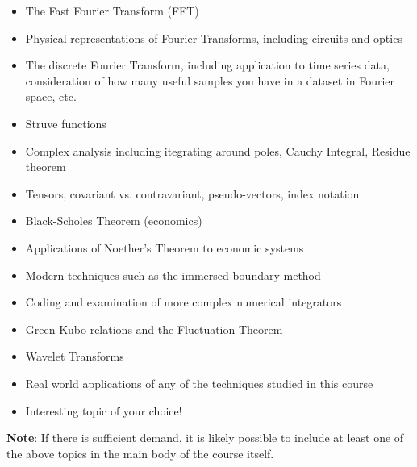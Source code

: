\documentclass[12pt]{article}
\begin{document}
\begin{itemize}
  \item The Fast Fourier Transform (FFT)
  \item Physical representations of Fourier Transforms, including circuits and optics
  \item The discrete Fourier Transform, including application to time series data, consideration of how many useful samples you have in a dataset in Fourier space, etc.
  \item Struve functions
  \item Complex analysis including itegrating around poles, Cauchy Integral, Residue theorem
  \item Tensors, covariant vs. contravariant, pseudo-vectors, index notation
  \item Black-Scholes Theorem (economics)
  \item Applications of Noether's Theorem to economic systems
  \item Modern techniques such as the immersed-boundary method
  \item Coding and examination of more complex numerical integrators
  \item Green-Kubo relations and the Fluctuation Theorem
  \item Wavelet Transforms
  \item Real world applications of any of the techniques studied in this course
  \item Interesting topic of your choice!
\end{itemize}

\textbf{Note}: If there is sufficient demand, it is likely possible to include at least one of the above topics in the main body of the course itself.
\end{document}
